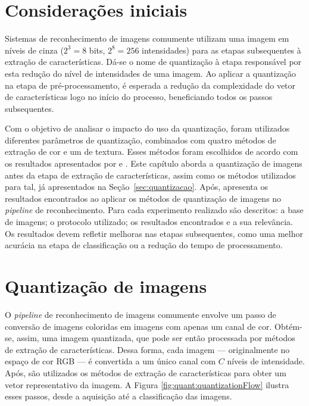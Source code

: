 \section{Considerações iniciais}

Sistemas de reconhecimento de imagens comumente utilizam uma imagem em níveis de cinza ($2^3 = 8$ bits, $2^8 = 256$ intensidades) para as etapas subsequentes à extração de características. Dá-se o nome de quantização à etapa responsável por esta redução do nível de intensidades de uma imagem. Ao aplicar a quantização na etapa de pré-processamento, é esperada a redução da complexidade do vetor de características logo no início do processo, beneficiando todos os passos subsequentes.

Com o objetivo de analisar o impacto do uso da quantização, foram utilizados diferentes parâmetros de quantização, combinados com quatro métodos de extração de cor e um de textura. Esses métodos foram escolhidos de acordo com os resultados apresentados por  e . Este capítulo aborda a quantização de imagens antes da etapa de extração de características, assim como os métodos utilizados para tal, já apresentados na Seção~\ref{sec:quantizacao}. Após, apresenta os resultados encontrados ao aplicar os métodos de quantização de imagens no \textit{pipeline} de reconhecimento. Para cada experimento realizado são descritos: a base de imagens; o protocolo utilizado; os resultados encontrados e a sua relevância. Os resultados devem refletir melhoras nas etapas subsequentes, como uma melhor acurácia na etapa de classificação ou a redução do tempo de processamento.


\section{Quantização de imagens}

O \textit{pipeline}  de reconhecimento de imagens comumente envolve um passo de conversão de imagens coloridas em imagens com apenas um canal de cor. Obtém-se, assim, uma imagem quantizada, que pode ser então processada por métodos de extração de características. Dessa forma, cada imagem --- originalmente no espaço de cor RGB --- é convertida a um único canal com $C$ níveis de intensidade. Após, são utilizados os métodos de extração de características para obter um vetor representativo da imagem. A Figura \ref{fig:quant:quantizationFlow} ilustra esses passos, desde a aquisição até a classificação das imagens.

